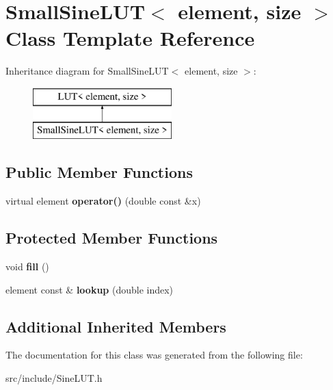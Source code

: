 \hypertarget{class_small_sine_l_u_t}{\section{Small\+Sine\+L\+U\+T$<$ element, size $>$ Class Template Reference}
\label{class_small_sine_l_u_t}
}
Inheritance diagram for Small\+Sine\+L\+U\+T$<$ element, size $>$\+:\begin{figure}[H]
\begin{center}
\leavevmode
\includegraphics[height=2.000000cm]{class_small_sine_l_u_t}
\end{center}
\end{figure}
\subsection*{Public Member Functions}
\begin{DoxyCompactItemize}
\item 
\hypertarget{class_small_sine_l_u_t_a8ae3a056574879a1be51f77d3ddd0390}{virtual element {\bfseries operator()} (double const \&x)}\label{class_small_sine_l_u_t_a8ae3a056574879a1be51f77d3ddd0390}

\end{DoxyCompactItemize}
\subsection*{Protected Member Functions}
\begin{DoxyCompactItemize}
\item 
\hypertarget{class_small_sine_l_u_t_a231225f5be38bdca739edaad2ca1f597}{void {\bfseries fill} ()}\label{class_small_sine_l_u_t_a231225f5be38bdca739edaad2ca1f597}

\item 
\hypertarget{class_small_sine_l_u_t_aa015c331255c56304e400f8a72b75f98}{element const \& {\bfseries lookup} (double index)}\label{class_small_sine_l_u_t_aa015c331255c56304e400f8a72b75f98}

\end{DoxyCompactItemize}
\subsection*{Additional Inherited Members}


The documentation for this class was generated from the following file\+:\begin{DoxyCompactItemize}
\item 
src/include/Sine\+L\+U\+T.\+h\end{DoxyCompactItemize}
